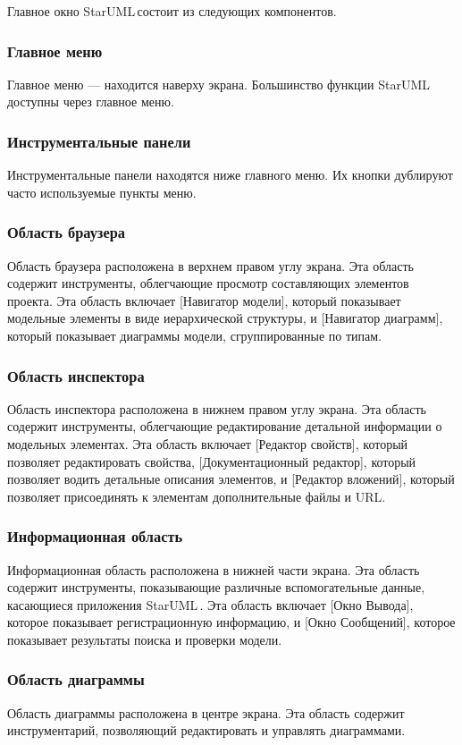 \documentclass[a4paper,12pt]{report}
\newcommand{\staruml}{StarUML\,\tm}
\begin{document}
Главное окно \staruml состоит из следующих компонентов.
\subsubsection*{Главное меню}
Главное меню --- находится наверху экрана. Большинство функции \staruml доступны через
главное меню.

\subsubsection*{Инструментальные панели}
Инструментальные панели находятся ниже главного меню. Их кнопки дублируют часто
используемые пункты меню.

\subsubsection*{Область браузера}
Область браузера расположена в верхнем правом углу экрана. Эта область содержит
инструменты, облегчающие просмотр составляющих элементов проекта. Эта область включает
[Навигатор модели], который показывает модельные элементы в виде иерархической структуры, и
[Навигатор диаграмм], который показывает диаграммы модели, сгруппированные по типам.

\subsubsection*{Область инспектора}
Область инспектора расположена в нижнем правом углу экрана. Эта область содержит
инструменты, облегчающие редактирование детальной информации о модельных элементах. Эта
область включает [Редактор свойств], который позволяет редактировать свойства,
[Документационный редактор], который позволяет водить детальные описания элементов, и
[Редактор вложений], который позволяет присоединять к элементам дополнительные файлы и
URL.
\subsubsection*{Информационная область}
Информационная область расположена в нижней части экрана. Эта область содержит
инструменты, показывающие различные вспомогательные данные, касающиеся приложения
\staruml. Эта область включает [Окно Вывода], которое показывает регистрационную
информацию, и [Окно Сообщений], которое показывает результаты поиска и проверки модели.
\subsubsection*{Область диаграммы}
Область диаграммы расположена в центре экрана. Эта область содержит инструментарий,
позволяющий редактировать и управлять диаграммами.
\end{document}
